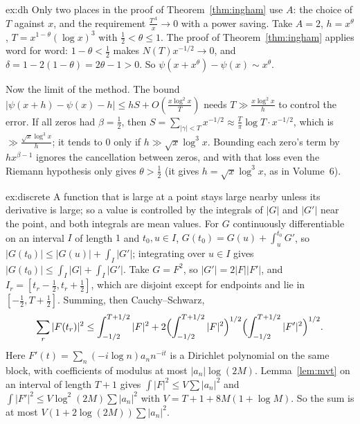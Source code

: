 \begin{solution}{ex:dh}
\idea Only two places in the proof of Theorem~\ref{thm:ingham} use $A$: the choice of $T$ against $x$, and the requirement $\frac{T^A}x\to0$ with a power saving.
\writeup Take $A=2$, $h=x^\theta$, $T=x^{1-\theta}(\log x)^3$ with $\frac12<\theta\le1$. The proof of Theorem~\ref{thm:ingham} applies word for word: $1-\theta<\frac12$ makes $N(T)x^{-1/2}\to0$, and $\delta=1-2(1-\theta)=2\theta-1>0$. So $\psi(x+x^\theta)-\psi(x)\sim x^\theta$.

Now the limit of the method. The bound $|\psi(x+h)-\psi(x)-h|\le hS+O(\frac{x\log^2x}T)$ needs $T\gg\frac{x\log^2x}h$ to control the error. If all zeros had $\beta=\frac12$, then $S=\sum_{|\gamma|<T}x^{-1/2}\approx\frac T\pi\log T\cdot x^{-1/2}$, which is $\gg\frac{\sqrt x\log^3 x}h$; it tends to $0$ only if $h\gg\sqrt x\log^3x$. Bounding each zero's term by $hx^{\beta-1}$ ignores the cancellation between zeros, and with that loss even the Riemann hypothesis only gives $\theta>\frac12$ (it gives $h=\sqrt x\log^3x$, as in Volume~6).
\end{solution}

\begin{solution}{ex:discrete}
\idea A function that is large at a point stays large nearby unless its derivative is large; so a value is controlled by the integrals of $|G|$ and $|G'|$ near the point, and both integrals are mean values.
\writeup For $G$ continuously differentiable on an interval $I$ of length $1$ and $t_0,u\in I$, $G(t_0)=G(u)+\int_u^{t_0}G'$, so $|G(t_0)|\le|G(u)|+\int_I|G'|$; integrating over $u\in I$ gives $|G(t_0)|\le\int_I|G|+\int_I|G'|$. Take $G=F^2$, so $|G'|=2|F||F'|$, and $I_r=[t_r-\frac12,t_r+\frac12]$, which are disjoint except for endpoints and lie in $[-\frac12,T+\frac12]$. Summing, then Cauchy--Schwarz,
\[
\sum_r|F(t_r)|^2\le\int_{-1/2}^{T+1/2}|F|^2+2\Bigl(\int_{-1/2}^{T+1/2}|F|^2\Bigr)^{1/2}\Bigl(\int_{-1/2}^{T+1/2}|F'|^2\Bigr)^{1/2}.
\]
Here $F'(t)=\sum_n(-i\log n)a_nn^{-it}$ is a Dirichlet polynomial on the same block, with coefficients of modulus at most $|a_n|\log(2M)$. Lemma~\ref{lem:mvt} on an interval of length $T+1$ gives $\int|F|^2\le V\sum|a_n|^2$ and $\int|F'|^2\le V\log^2(2M)\sum|a_n|^2$ with $V=T+1+8M(1+\log M)$. So the sum is at most $V(1+2\log(2M))\sum|a_n|^2$.
\end{solution}

